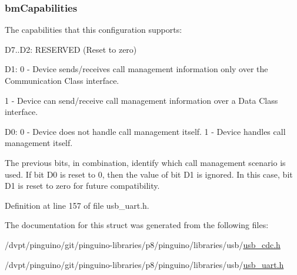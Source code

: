 \hypertarget{struct_u_s_b___call___management___functional___descriptor_af402fe1fda6ed7e80071146e003be43e}{
\subsubsection[{bm\-Capabilities}]{ bm\-Capabilities}}\label{struct_u_s_b___call___management___functional___descriptor_af402fe1fda6ed7e80071146e003be43e}
The capabilities that this configuration supports\-:
\begin{DoxyItemize}
\item D7..D2\-: R\-E\-S\-E\-R\-V\-E\-D (Reset to zero)
\item D1\-: 0 -\/ Device sends/receives call management information only over the Communication Class interface.\par
1 -\/ Device can send/receive call management information over a Data Class interface.
\item D0\-: 0 -\/ Device does not handle call management itself. 1 -\/ Device handles call management itself.
\end{DoxyItemize}The previous bits, in combination, identify which call management scenario is used. If bit D0 is reset to 0, then the value of bit D1 is ignored. In this case, bit D1 is reset to zero for future compatibility. 

Definition at line 157 of file usb\-\_\-uart.\-h.



The documentation for this struct was generated from the following files\-:\begin{DoxyCompactItemize}
\item 
/dvpt/pinguino/git/pinguino-\/libraries/p8/pinguino/libraries/usb/\hyperlink{usb__cdc_8h}{usb\-\_\-cdc.\-h}\item 
/dvpt/pinguino/git/pinguino-\/libraries/p8/pinguino/libraries/usb/\hyperlink{usb__uart_8h}{usb\-\_\-uart.\-h}\end{DoxyCompactItemize}

